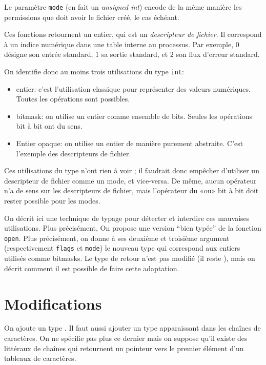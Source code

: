 Le paramètre \texttt{mode} (en fait un \emph{unsigned int}) encode de la même
manière les permissions que doit avoir le fichier créé, le cas échéant.

Ces fonctions retournent un entier, qui est un \emph{descripteur de fichier}. Il
correspond à un indice numérique dans une table interne au processus. Par
exemple, $0$ désigne son entrée standard, $1$ sa sortie standard, et $2$ son
flux d'erreur standard.

On identifie donc au moins trois utilisations du type \texttt{int}:

\begin{itemize}
    \item entier: c'est l'utilisation classique pour représenter des valeurs
        numériques. Toutes les opérations sont possibles.
    \item bitmask: on utilise un entier comme ensemble de bits. Seules les
        opérations bit à bit ont du sens.
    \item Entier opaque: on utilise un entier de manière purement abstraite.
        C'est l'exemple des descripteurs de fichier.
\end{itemize}

Ces utilisations du type n'ont rien à voir ; il faudrait donc empêcher
d'utiliser un descripteur de fichier comme un mode, et vice-versa. De même,
aucun opérateur n'a de sens sur les descripteurs de fichier, mais l'opérateur
\texttt{\textbar{}} du «ou» bit à bit doit rester possible pour les modes.

On décrit ici une technique de typage pour détecter et interdire ces mauvaises
utilisations. Plus précisément, On propose une version ``bien typée'' de la
fonction \texttt{open}. Plus précisément, on donne à ses deuxième et troisième
argument (respectivement \texttt{flags} et \texttt{mode}) le nouveau type \tBits
qui correspond aux entiers utilisés comme bitmasks. Le type de retour n'est pas
modifié (il reste \tInt), mais on décrit comment il est possible de faire cette
adaptation.

\section{Modifications}

On ajoute un type \tBits. Il faut aussi ajouter un type \tChar apparaissant dans
les chaînes de caractères. On ne spécifie pas plus ce dernier mais on suppose
qu'il existe des littéraux de chaînes qui retournent un pointeur vers le premier
élément d'un tableaux de caractères.

